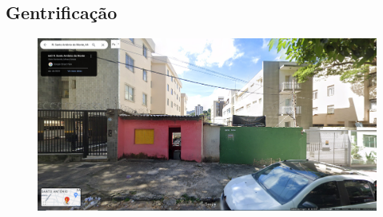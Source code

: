 \subsection{Gentrificação}
\begin{frame}

    \begin{figure}[!htbp]
                \centering
       	    \includegraphics[scale=0.26]{imagens/gentrificacao.png}
            \end{figure}
\end{frame}


